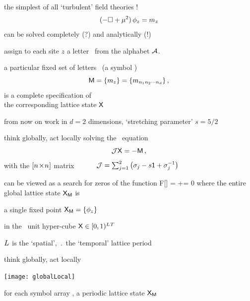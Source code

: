 \begin{frame}{the simplest of all `turbulent' field theories ! }
\catlatt
\[
 (-\Box + {\mu}^2)\,\phi_{z} = m_z
\] %
\bigskip
\hfill can be solved completely (?) and analytically (!)

\bigskip
\bigskip

assign to each site $z$ a
letter \ from the alphabet $\mathcal{A}$.

\medskip

a particular fixed set
of letters  \ (a symbol \brick)
\[
\Mm= \{\Ssym{z}\} %
 = \{\Ssym{n_1 n_2 \cdots n_d}\}
\,,
\]
is a complete specification of  \\
the corresponding lattice state $\mathsf{X}$
\bigskip

{\color{blue}\footnotesize
from now on work in $d=2$ dimensions, `stretching parameter'
$s=5/2$
}
\end{frame} %

\begin{frame}{think globally, act locally}
solving the \catlatt\ equation
\[
{\cal J}\mathsf{X}= -\mathsf{M}
\,,
\]
with
the $[{n_{}}\!\times\!{n_{}}]$ matrix ~~~~~
\(
{\cal J} = \sum_{j=1}^{2}\left(\mathbf{\sigma}_j-{s}\mathsf{1}+\mathbf{\sigma}_{j}^{-1}\right)
\) %
\medskip

can be viewed as a search for zeros of the function
\beq
F[\Xx] = \jMorb\Xx+\Mm = 0
where the entire {\color{blue}global lattice state} ${\mathsf{X}}_{\mathsf{M}}$ is
\medskip

a single {\color{blue}fixed point}
${\mathsf{X}}_{\mathsf{M}}=\{\phi_z\}$

\hfill
in the \speriod{}\period{}\dmn\ unit hyper-cube $\mathsf{X}\in[0,1)^{{L_{}}{T_{}}}$
\medskip

${L_{}}$ is the `spatial',
$\period{}$ the `temporal' lattice period
\end{frame} %

\begin{frame}{think globally, act locally}
    \begin{center}
\texttt{[image: globalLocal]}
    \end{center}
for each symbol array \Mm, a periodic lattice state $\mathsf{X}_{\mathsf{M}}$
\end{frame} %

